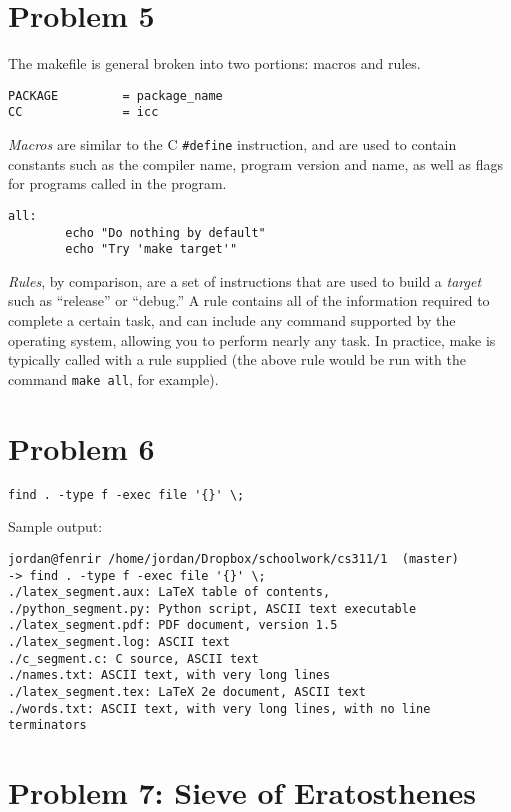 \documentclass[12pt,letterpaper]{article}
\begin{document}
\section*{Problem 5}
The makefile is general broken into two portions: macros and rules.
\begin{lstlisting}
PACKAGE         = package_name
CC              = icc
\end{lstlisting}
\emph{Macros} are similar to the C \verb!#define! instruction, and are used to contain
constants such as the compiler name, program version and name, as well as flags
for programs called in the program.
\begin{lstlisting}
all:
        echo "Do nothing by default"
        echo "Try 'make target'"
\end{lstlisting}
\emph{Rules}, by comparison, are a set of instructions that are used to
build a \emph{target} such as ``release'' or ``debug.'' A rule contains all of the
information required to complete a certain task, and can include any command
supported by the operating system, allowing you to perform nearly any task. In
practice, make is typically called with a rule supplied (the above rule
would be run with the command \verb~make all~, for example).

\section*{Problem 6}
\begin{lstlisting}
find . -type f -exec file '{}' \;
\end{lstlisting}

Sample output:
\begin{lstlisting}
jordan@fenrir /home/jordan/Dropbox/schoolwork/cs311/1  (master)
-> find . -type f -exec file '{}' \;
./latex_segment.aux: LaTeX table of contents, 
./python_segment.py: Python script, ASCII text executable
./latex_segment.pdf: PDF document, version 1.5
./latex_segment.log: ASCII text
./c_segment.c: C source, ASCII text
./names.txt: ASCII text, with very long lines
./latex_segment.tex: LaTeX 2e document, ASCII text
./words.txt: ASCII text, with very long lines, with no line terminators
\end{lstlisting}

\section*{Problem 7: Sieve of Eratosthenes}

\end{document}
